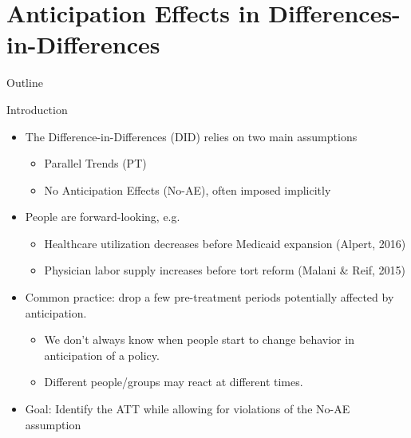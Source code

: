 \documentclass[aspectratio=1610, 9pt]{beamer}
\begin{document}
\section{Anticipation Effects in Differences-in-Differences}
\begin{frame}{Outline}
    \tableofcontents[sectionstyle=show/shaded]
\end{frame}

\begin{frame}{Introduction}
\begin{itemize}
    \item The Difference-in-Differences (DID) relies on two main assumptions
         \begin{itemize}
     \item[-] Parallel Trends (PT)
     \item[-] No Anticipation Effects (No-AE), often imposed implicitly
     \end{itemize}
     
    \item People are forward-looking, e.g. 
     \begin{itemize}
     \item[-] Healthcare utilization decreases before Medicaid expansion (Alpert, 2016)
     \item[-] Physician labor supply increases before tort reform (Malani \& Reif, 2015)
     \end{itemize}
     \item Common practice: drop a few pre-treatment periods potentially affected by anticipation. 
     \begin{itemize}
         \item We don’t always know when people start to change behavior in anticipation of a policy.
         \item Different people/groups may react at different times.
     \end{itemize}
    \item Goal: Identify the ATT while allowing for violations of the No-AE assumption
\end{itemize}
\end{frame}
\end{document}
